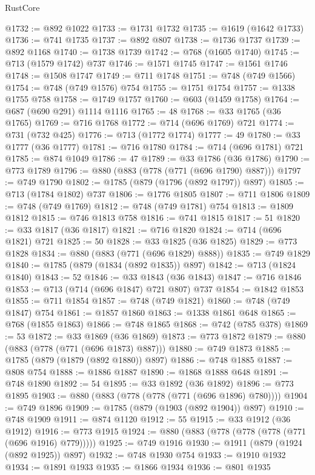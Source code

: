\begin{lexlean}{RustCore}
\begin{coremodule}
@1732 := @892 @1022
@1733 := @1731 @1732
@1735 := @1619 (@1642 @1733)
@1736 := @741 @1735
@1737 := @892 @807
@1738 := @1736 @1737
@1739 := @892 @1168
@1740 := @1738 @1739
@1742 := @768 (@1605 @1740)
@1745 := @713 (@1579 @1742) @737
@1746 := @1571 @1745
@1747 := @1561 @1746
@1748 := @1508 @1747
@1749 := @711 @1748
@1751 := @748 (@749 @1566)
@1754 := @748 (@749 @1576) @754
@1755 := @1751 @1754
@1757 := @1338 @1755 @758
@1758 := @1749 @1757
@1760 := @603 (@1459 @1758)
@1764 := @687 (@690 @291) @1114 @1116
@1765 := 48
@1768 := @33 @1765 (@36 @1765)
@1769 := @716 @1768
@1772 := @714 (@696 @1769) @721
@1774 := @731 (@732 @425)
@1776 := @713 (@1772 @1774)
@1777 := 49
@1780 := @33 @1777 (@36 @1777)
@1781 := @716 @1780
@1784 := @714 (@696 @1781) @721
@1785 := @874 @1049
@1786 := 47
@1789 := @33 @1786 (@36 @1786)
@1790 := @773 @1789
@1796 := @880 (@883 (@778 (@771 (@696 @1790) @887)))
@1797 := @749 @1790
@1802 := @1785 (@879 (@1796 (@892 @1797)) @897)
@1805 := @713 (@1784 @1802) @737
@1806 := @1776 @1805
@1807 := @711 @1806
@1809 := @748 (@749 @1769)
@1812 := @748 (@749 @1781) @754
@1813 := @1809 @1812
@1815 := @746 @1813 @758
@1816 := @741 @1815
@1817 := 51
@1820 := @33 @1817 (@36 @1817)
@1821 := @716 @1820
@1824 := @714 (@696 @1821) @721
@1825 := 50
@1828 := @33 @1825 (@36 @1825)
@1829 := @773 @1828
@1834 := @880 (@883 (@771 (@696 @1829) @888))
@1835 := @749 @1829
@1840 := @1785 (@879 (@1834 (@892 @1835)) @897)
@1842 := @713 (@1824 @1840)
@1843 := 52
@1846 := @33 @1843 (@36 @1843)
@1847 := @716 @1846
@1853 := @713 (@714 (@696 @1847) @721 @807) @737
@1854 := @1842 @1853
@1855 := @711 @1854
@1857 := @748 (@749 @1821)
@1860 := @748 (@749 @1847) @754
@1861 := @1857 @1860
@1863 := @1338 @1861 @648
@1865 := @768 (@1855 @1863)
@1866 := @748 @1865
@1868 := @742 (@785 @378)
@1869 := 53
@1872 := @33 @1869 (@36 @1869)
@1873 := @773 @1872
@1879 := @880 (@883 (@778 (@771 (@696 @1873) @887)))
@1880 := @749 @1873
@1885 := @1785 (@879 (@1879 (@892 @1880)) @897)
@1886 := @748 @1885
@1887 := @808 @754
@1888 := @1886 @1887
@1890 := @1868 @1888 @648
@1891 := @748 @1890
@1892 := 54
@1895 := @33 @1892 (@36 @1892)
@1896 := @773 @1895
@1903 := @880 (@883 (@778 (@778 (@771 (@696 @1896) @780))))
@1904 := @749 @1896
@1909 := @1785 (@879 (@1903 (@892 @1904)) @897)
@1910 := @748 @1909
@1911 := @874 @1120
@1912 := 55
@1915 := @33 @1912 (@36 @1912)
@1916 := @773 @1915
@1924 := @880 (@883 (@778 (@778 (@778 (@771 (@696 @1916) @779)))))
@1925 := @749 @1916
@1930 := @1911 (@879 (@1924 (@892 @1925)) @897)
@1932 := @748 @1930 @754
@1933 := @1910 @1932
@1934 := @1891 @1933
@1935 := @1866 @1934
@1936 := @801 @1935

\end{coremodule}
\end{lexlean}
